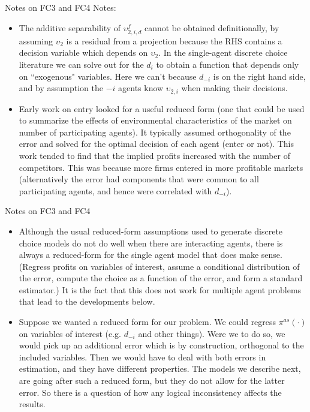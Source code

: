 \documentclass[aspectratio=169,11pt]{beamer}
\begin{document}
\begin{frame}{Notes on FC3 and FC4}
Notes:

\small
\begin{itemize}

\item The additive separability of $\upsilon _{2,i,d}^{f}$ cannot be
obtained definitionally, by assuming $\upsilon _{2}$ is a residual from a
projection because the RHS contains a
decision variable which depends on $\upsilon _{2}$. In the single-agent discrete choice literature we can solve out for the $d_{i}$ to obtain a function that depends only on ``exogenous" variables.
Here we can't because $d_{-i}$ is on the right hand side,
and by assumption the $-i$ agents know $\upsilon _{2,i}$ when making their
decisions.
\item Early work on entry looked for a useful reduced form (one that could be used to summarize the effects of environmental characteristics of the market on number of participating agents). It typically assumed orthogonality of the error and solved for the optimal decision of each agent (enter or not). This work tended to find that the implied profits increased with the number of competitors. This was because more firms entered in more profitable markets (alternatively the error had components that were common to all participating agents, and hence were correlated with $d_{-i}$).
\end{itemize}
\end{frame}

\begin{frame}{Notes on FC3 and FC4}
\small
\begin{itemize}
\item Although the usual reduced-form assumptions used to generate discrete choice models do not do well when there are interacting agents, there is always a reduced-form for the single agent model that does make sense.  (Regress profits on variables of interest, assume a conditional distribution of the error, compute the choice as a function of the error, and form a standard estimator.)  It is the fact that this does not work for multiple agent problems that lead to the developments below.
\item Suppose we wanted a reduced form for our problem. We could regress $\pi^{as}(\cdot)$ on variables of interest (e.g. $d_{-i}$ and other things). Were we to do so, we would pick up an additional error which is by construction, orthogonal to the included variables. Then we would have to deal with both errors in estimation, and they have different properties. The models we describe next, are going after such a reduced form, but they do not allow for the latter error. So there is a question of how any logical inconsistency affects the results.
\end{itemize}
\end{frame}
\end{document}
